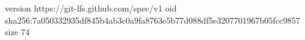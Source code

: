 version https://git-lfs.github.com/spec/v1
oid sha256:7a050332935df845b4ab3c0a9fa8763e5b77d088df5e3207701967b05fcc9857
size 74
